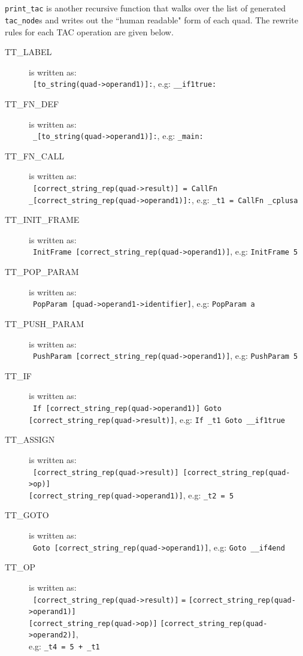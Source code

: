 \ \\ \ \\
\verb!print_tac! is another recursive function that walks over the list of generated \verb!tac_node!s and writes out the ``human readable" form of each quad. The rewrite rules for each TAC operation are given below.
\begin{description}
	\item[TT\_LABEL] is written as: \\ \ \verb![to_string(quad->operand1)]:!, e.g: \verb!__if1true:!
	\item[TT\_FN\_DEF] is written as: \\ \ \verb!_[to_string(quad->operand1)]:!, e.g: \verb!_main:!
	\item[TT\_FN\_CALL] is written as: \\ \ \verb![correct_string_rep(quad->result)] = CallFn _[correct_string_rep(quad->operand1)]:!, e.g: \verb!_t1 = CallFn _cplusa!
	\item[TT\_INIT\_FRAME] is written as: \\ \ \verb!InitFrame [correct_string_rep(quad->operand1)]!, e.g: \verb!InitFrame 5!
	\item[TT\_POP\_PARAM] is written as: \\ \ \verb!PopParam [quad->operand1->identifier]!, e.g: \verb!PopParam a!		
	\item[TT\_PUSH\_PARAM] is written as: \\ \ \verb!PushParam [correct_string_rep(quad->operand1)]!, e.g: \verb!PushParam 5!
	\item[TT\_IF] is written as: \\ \ \verb!If [correct_string_rep(quad->operand1)] Goto [correct_string_rep(quad->result)]!, e.g: \verb!If _t1 Goto __if1true!
	\item[TT\_ASSIGN] is written as: \\ \ \verb![correct_string_rep(quad->result)] [correct_string_rep(quad->op)]! \\ \verb![correct_string_rep(quad->operand1)]!, e.g: \verb!_t2 = 5!
	\item[TT\_GOTO] is written as: \\ \ \verb!Goto [correct_string_rep(quad->operand1)]!, e.g: \verb!Goto __if4end!
	\item[TT\_OP] is written as: \\ \ \verb![correct_string_rep(quad->result)]! \verb!=! \verb![correct_string_rep(quad->operand1)]! \\ \verb![correct_string_rep(quad->op)]! \verb![correct_string_rep(quad->operand2)]!,\\ e.g: \verb!_t4 = 5 + _t1!

\end{description}
